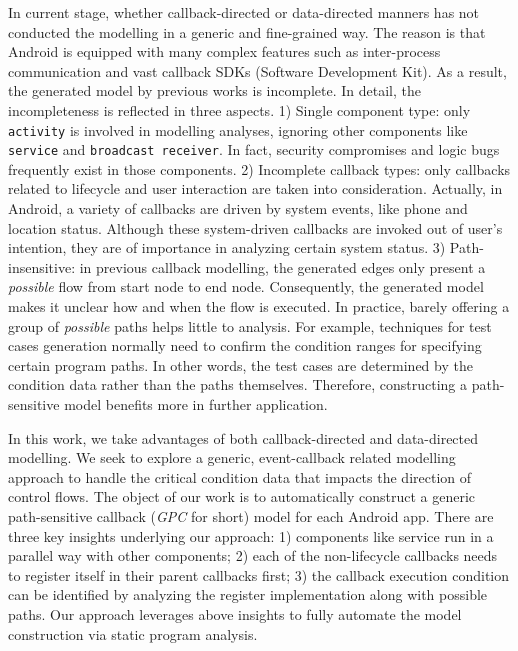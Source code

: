 In current stage, whether callback-directed or data-directed manners has not conducted the modelling in a generic and fine-grained way. The reason is that Android is equipped with many complex features such as inter-process communication and vast callback SDKs (Software Development Kit). As a result, the generated model by previous works \cite{new2013contextual,new2015static, new2015window} is incomplete. In detail, the incompleteness is reflected in three aspects. 1) Single component type: only \texttt{activity} is involved in modelling analyses, ignoring other components like \texttt{service} and \texttt{broadcast receiver}. In fact, security compromises and logic bugs frequently exist in those components. 2) Incomplete callback types: only callbacks related to lifecycle and user interaction are taken into consideration. Actually, in Android, a variety of callbacks are driven by system events, like phone and location status. Although these system-driven callbacks are invoked out of user's intention, they are of importance in analyzing certain system status. 3) Path-insensitive: in previous callback modelling, the generated edges only present a \textit{possible} flow from start node to end node. Consequently, the generated model makes it unclear how and when the flow is executed. In practice, barely offering a group of \textit{possible} paths helps little to analysis. For example, techniques for test cases generation normally need to confirm the condition ranges for specifying certain program paths. In other words, the test cases are determined by the condition data rather than the paths themselves. Therefore, constructing a path-sensitive model benefits more in further application.    

In this work, we take advantages of both callback-directed and data-directed modelling. We seek to explore a generic, event-callback related modelling approach to handle the critical condition data that impacts the direction of control flows. The object of our work is to automatically construct a generic path-sensitive callback (\textit{GPC} for short) model for each Android app. There are three key insights underlying our approach: 1) components like service run in a parallel way with other components; 2) each of the non-lifecycle callbacks needs to register itself in their parent callbacks first; 3) the callback execution condition can be identified by analyzing the register implementation along with possible paths. Our approach leverages above insights to fully automate the model construction via static program analysis. 

